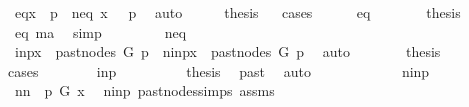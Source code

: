 \begin{isabellebody}
\ {\isacharparenleft}{\kern0pt}eq{\isacharparenright}{\kern0pt}{\isachardoublequoteopen}x\ {\isacharequal}{\kern0pt}\ p{\isachardoublequoteclose}\ {\isacharbar}{\kern0pt}\ {\isacharparenleft}{\kern0pt}neq{\isacharparenright}{\kern0pt}\ {\isachardoublequoteopen}{\isasymnot}x\ {\isacharequal}{\kern0pt}\ \ p{\isachardoublequoteclose}\ \isamarkupfalse%
\ auto\isanewline
\ \ \isamarkupfalse%
\ \isamarkupfalse%
\ {\isacharquery}{\kern0pt}thesis\isanewline
\ \ \isamarkupfalse%
{\isacharparenleft}{\kern0pt}cases{\isacharparenright}{\kern0pt}\isanewline
\ \ \ \ \isamarkupfalse%
\ eq\isanewline
\ \ \ \ \isamarkupfalse%
\ \isamarkupfalse%
\ thesis\ \isamarkupfalse%
\ eq\ ma\ \isamarkupfalse%
\ simp\isanewline
\ \ \isamarkupfalse%
\isanewline
\ \ \ \ \isamarkupfalse%
\ neq\isanewline
\ \ \ \ \isamarkupfalse%
\ {\isacharparenleft}{\kern0pt}in{\isacharunderscore}{\kern0pt}p{\isacharparenright}{\kern0pt}{\isachardoublequoteopen}x\ {\isasymin}\ past{\isacharunderscore}{\kern0pt}nodes\ G\ p{\isachardoublequoteclose}\ {\isacharbar}{\kern0pt}\ {\isacharparenleft}{\kern0pt}nin{\isacharunderscore}{\kern0pt}p{\isacharparenright}{\kern0pt}{\isachardoublequoteopen}x\ {\isasymnotin}\ past{\isacharunderscore}{\kern0pt}nodes\ G\ p{\isachardoublequoteclose}\ \isamarkupfalse%
\ auto\isanewline
\ \ \ \ \isamarkupfalse%
\ \isamarkupfalse%
\ {\isacharquery}{\kern0pt}thesis\ \isanewline
\ \ \ \ \isamarkupfalse%
{\isacharparenleft}{\kern0pt}cases{\isacharparenright}{\kern0pt}\isanewline
\ \ \ \ \ \ \isamarkupfalse%
\ in{\isacharunderscore}{\kern0pt}p\isanewline
\ \ \ \ \ \ \isamarkupfalse%
\ \isamarkupfalse%
\ {\isacharquery}{\kern0pt}thesis\ \isamarkupfalse%
\ past\ \isamarkupfalse%
\ auto\isanewline
\ \ \ \ \isamarkupfalse%
\isanewline
\ \ \ \ \ \ \isamarkupfalse%
\ nin{\isacharunderscore}{\kern0pt}p\isanewline
\ \ \ \ \ \ \isamarkupfalse%
\ \isamarkupfalse%
\ nn{\isacharcolon}{\kern0pt}\ {\isachardoublequoteopen}{\isasymnot}\ p\ {\isasymrightarrow}\isactrlsup {\isacharplus}{\kern0pt}\isactrlbsub G\isactrlesub \ x{\isachardoublequoteclose}\ \isamarkupfalse%
\ nin{\isacharunderscore}{\kern0pt}p\ past{\isacharunderscore}{\kern0pt}nodes{\isachardot}{\kern0pt}simps\ assms{\isacharparenleft}{\kern0pt}{}{\isacharparenright}{\kern0pt}\ \isamarkupfalse%

\end{isabellebody}
